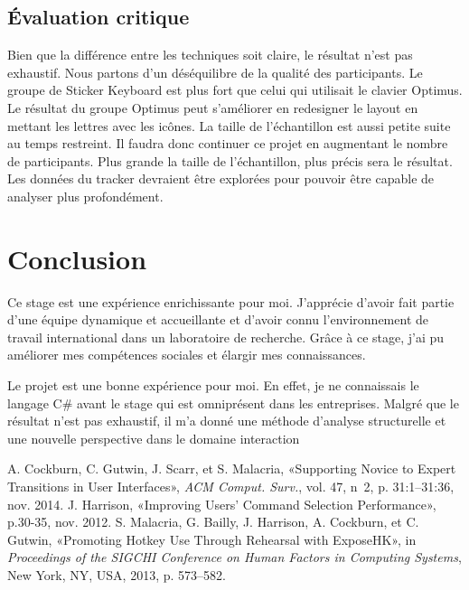 \documentclass[12pt,a4paper]{article}
\begin{document}
\subsection{Évaluation critique}
Bien que la différence entre les techniques soit claire, le résultat n'est pas exhaustif. Nous partons d'un déséquilibre de la qualité des participants. Le groupe de Sticker Keyboard est plus fort que celui qui utilisait le clavier Optimus. Le résultat du groupe Optimus peut s'améliorer en redesigner le layout en mettant les lettres avec les icônes. La taille de l'échantillon est aussi petite suite au temps restreint. Il faudra donc continuer ce projet en augmentant le nombre de participants. Plus grande la taille de l'échantillon, plus précis sera le résultat. Les données du tracker devraient être explorées pour pouvoir être capable de analyser plus profondément.
\section{Conclusion}
Ce stage est une expérience enrichissante pour moi. J'apprécie d'avoir fait partie d'une équipe dynamique et accueillante et d'avoir connu l'environnement de travail international dans un laboratoire de recherche. Grâce à ce stage, j'ai pu améliorer mes compétences sociales et élargir mes connaissances.

Le projet est une bonne expérience pour moi. En effet, je ne connaissais le langage C\# avant le stage qui est omniprésent dans les entreprises. Malgré que le résultat n'est pas exhaustif, il m'a donné une méthode d'analyse structurelle et une nouvelle perspective dans le domaine interaction
\newpage
\begin{thebibliography}{10}
	 A. Cockburn, C. Gutwin, J. Scarr, et S. Malacria, «Supporting Novice to Expert
	Transitions in User Interfaces», \textit{ACM Comput. Surv.}, vol. 47, n\textdegree\ 2, p. 31:1–31:36, nov. 2014.
	 J. Harrison, «Improving Users' Command Selection Performance», p.30-35, nov. 2012.
	 S. Malacria, G. Bailly, J. Harrison, A. Cockburn, et C. Gutwin, «Promoting Hotkey Use
	Through Rehearsal with ExposeHK», in \textit{Proceedings of the SIGCHI Conference on Human Factors in Computing Systems}, New York, NY, USA, 2013, p. 573–582.
\end{thebibliography}
\end{document}
